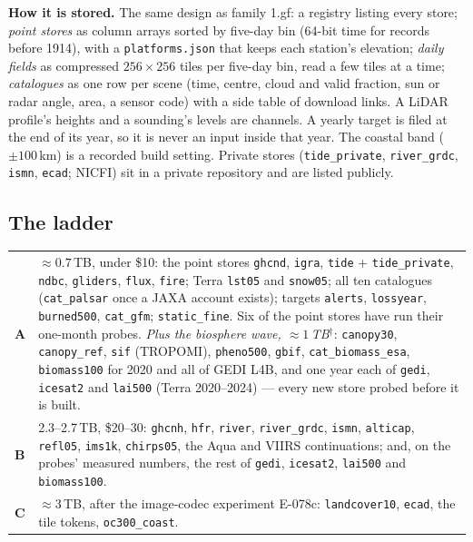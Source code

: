 \documentclass[10pt]{article}
\newcommand{\code}[1]{\texttt{#1}}
\begin{document}
\textbf{How it is stored.} The same design as family 1.gf: a registry listing every store; \emph{point stores}
as column arrays sorted by five-day bin (64-bit time for records before 1914), with a \code{platforms.json} that
keeps each station's elevation; \emph{daily fields} as compressed $256 \times 256$ tiles per five-day bin, read a
few tiles at a time; \emph{catalogues} as one row per scene (time, centre, cloud and valid fraction, sun or radar
angle, area, a sensor code) with a side table of download links. A LiDAR profile's heights and a sounding's
levels are channels. A yearly target is filed at the end of its year, so it is never an input inside that year.
The coastal band ($\pm 100$\,km) is a recorded build setting. Private stores (\code{tide\_private},
\code{river\_grdc}, \code{ismn}, \code{ecad}; NICFI) sit in a private repository and are listed publicly.

\subsection*{The ladder}
\begin{tabular}{@{}L{1.2cm}L{16.6cm}@{}}
\textbf{A} & $\approx 0.7$\,TB, under \$10: the point stores \code{ghcnd}, \code{igra}, \code{tide} + \code{tide\_private}, \code{ndbc}, \code{gliders}, \code{flux}, \code{fire}; Terra \code{lst05} and \code{snow05}; all ten catalogues (\code{cat\_palsar} once a JAXA account exists); targets \code{alerts}, \code{lossyear}, \code{burned500}, \code{cat\_gfm}; \code{static\_fine}. Six of the point stores have run their one-month probes. \emph{Plus the biosphere wave, $\approx 1$\,TB$^\dagger$}: \code{canopy30}, \code{canopy\_ref}, \code{sif} (TROPOMI), \code{pheno500}, \code{gbif}, \code{cat\_biomass\_esa}, \code{biomass100} for 2020 and all of GEDI L4B, and one year each of \code{gedi}, \code{icesat2} and \code{lai500} (Terra 2020--2024) --- every new store probed before it is built. \\
\textbf{B} & 2.3--2.7\,TB, \$20--30: \code{ghcnh}, \code{hfr}, \code{river}, \code{river\_grdc}, \code{ismn}, \code{alticap}, \code{refl05}, \code{ims1k}, \code{chirps05}, the Aqua and VIIRS continuations; and, on the probes' measured numbers, the rest of \code{gedi}, \code{icesat2}, \code{lai500} and \code{biomass100}. \\
\textbf{C} & $\approx 3$\,TB, after the image-codec experiment E-078c: \code{landcover10}, \code{ecad}, the tile tokens, \code{oc300\_coast}. \\
\end{tabular}
\end{document}
